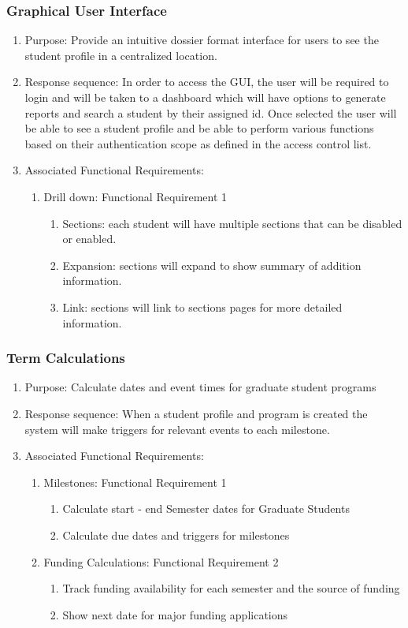 \documentclass{journal}
\begin{document}
        \subsubsection{Graphical User Interface}
\begin{enumerate}
\item Purpose: Provide an intuitive dossier format interface for users to see the student profile in a centralized location.
\item Response sequence: In order to access the GUI, the user will be required to login and will be taken to a dashboard which will have options to generate reports and search a student by their assigned id. Once selected the user will be able to see a student profile and be able to perform various functions based on their authentication scope as defined in the access control list.
\item Associated Functional Requirements:
\begin{enumerate}
\item Drill down: Functional Requirement 1
\begin{enumerate}
\item Sections: each student will have multiple sections that can be disabled or enabled.
\item Expansion: sections will expand to show summary of addition information.
\item Link: sections will link to sections pages for more detailed information.
\end{enumerate}
\end{enumerate}
\end{enumerate}
\subsubsection{Term Calculations}
\begin{enumerate}
\item Purpose: Calculate dates and event times for graduate student programs 
\item Response sequence: When a student profile and program is created the system will make triggers for relevant events to each milestone.
\item Associated Functional Requirements:
\begin{enumerate}
\item Milestones: Functional Requirement 1
\begin{enumerate}
\item Calculate start - end  Semester dates for Graduate Students
\item Calculate due dates and triggers for milestones
\end{enumerate}
\item Funding Calculations: Functional Requirement 2
\begin{enumerate}
\item Track funding availability for each semester and the source of funding
\item Show next date for major funding applications
\end{enumerate}
\end{enumerate}
\end{enumerate}
\end{document}
